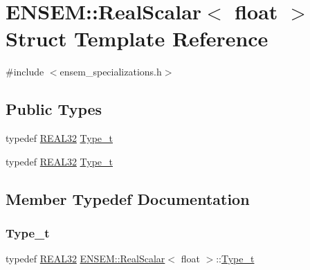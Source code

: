 \hypertarget{structENSEM_1_1RealScalar_3_01float_01_4}{}\section{E\+N\+S\+EM\+:\+:Real\+Scalar$<$ float $>$ Struct Template Reference}
\label{structENSEM_1_1RealScalar_3_01float_01_4}


{\ttfamily \#include $<$ensem\+\_\+specializations.\+h$>$}

\subsection*{Public Types}
\begin{DoxyCompactItemize}
\item 
typedef \mbox{\hyperlink{namespaceENSEM_a7540d01191172323e9073283d772576d}{R\+E\+A\+L32}} \mbox{\hyperlink{structENSEM_1_1RealScalar_3_01float_01_4_a897db3180e57c127ea66a260ac1d0bc4}{Type\+\_\+t}}
\item 
typedef \mbox{\hyperlink{namespaceENSEM_a7540d01191172323e9073283d772576d}{R\+E\+A\+L32}} \mbox{\hyperlink{structENSEM_1_1RealScalar_3_01float_01_4_a897db3180e57c127ea66a260ac1d0bc4}{Type\+\_\+t}}
\end{DoxyCompactItemize}


\subsection{Member Typedef Documentation}
\mbox{\label{structENSEM_1_1RealScalar_3_01float_01_4_a897db3180e57c127ea66a260ac1d0bc4}} 
\subsubsection{\texorpdfstring{Type\_t}{Type\_t}\hspace{0.1cm}{\footnotesize\ttfamily [1/2]}}
{\footnotesize\ttfamily typedef \mbox{\hyperlink{namespaceENSEM_a7540d01191172323e9073283d772576d}{R\+E\+A\+L32}} \mbox{\hyperlink{structENSEM_1_1RealScalar}{E\+N\+S\+E\+M\+::\+Real\+Scalar}}$<$ float $>$\+::\mbox{\hyperlink{structENSEM_1_1RealScalar_3_01float_01_4_a897db3180e57c127ea66a260ac1d0bc4}{Type\+\_\+t}}}

